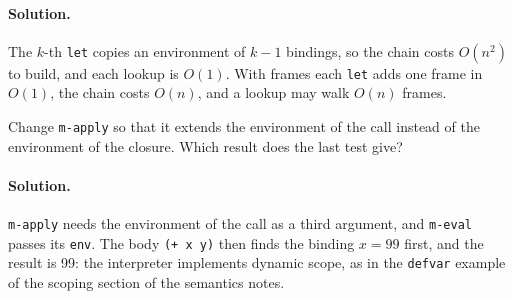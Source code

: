 \paragraph{Solution.} The $k$-th \texttt{let} copies an environment of $k - 1$
bindings, so the chain costs $O(n^2)$ to build, and each lookup is $O(1)$. With
frames each \texttt{let} adds one frame in $O(1)$, the chain costs $O(n)$, and a
lookup may walk $O(n)$ frames.

\begin{exercise}
Change \texttt{m-apply} so that it extends the environment of the call instead
of the environment of the closure. Which result does the last test give?
\end{exercise}

\paragraph{Solution.} \texttt{m-apply} needs the environment of the call as a
third argument, and \texttt{m-eval} passes its \texttt{env}. The body
\texttt{(+ x y)} then finds the binding $x = 99$ first, and the result is 99:
the interpreter implements dynamic scope, as in the \texttt{defvar} example of
the scoping section of the semantics notes.
